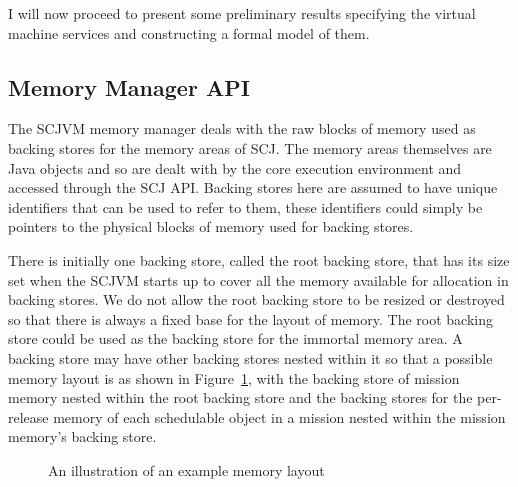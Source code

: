 \documentclass[a4paper,10pt]{article}
\begin{document}
I will now proceed to present some preliminary results specifying the virtual
machine services and constructing a formal model of them.

\subsection{Memory Manager API}
\label{memory-manager-sec}

The SCJVM memory manager deals with the raw blocks of memory used as backing
stores for the memory areas of SCJ. The memory areas themselves are Java objects
and so are dealt with by the core execution environment and accessed through the
SCJ API. Backing stores here are assumed to have unique identifiers that can be
used to refer to them, these identifiers could simply be pointers to the
physical blocks of memory used for backing stores.

There is initially one backing store, called the root backing store, that has
its size set when the SCJVM starts up to cover all the memory available for
allocation in backing stores. We do not allow the root backing store to be
resized or destroyed so that there is always a fixed base for the layout of 
memory. The root backing store could be used as the backing store for the
immortal memory area. A backing store may have other backing stores nested
within it so that a possible memory layout is as shown in 
Figure~\ref{memory-fig}, with the backing store of mission memory nested within
the root backing store and the backing stores for the per-release memory of each
schedulable object in a mission nested within the mission memory's backing
store.

\begin{figure}[ht]
  \centering
  \caption{An illustration of an example memory layout}
  \label{memory-fig}
\end{figure}
\end{document}
